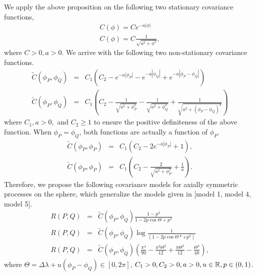\noi We apply the above proposition on the following two stationary covariance functions, 						
			\begin{eqnarray*}
				C(\phi) = Ce^{-a|\phi|} \\
				C(\phi) = C\frac{1}{\sqrt{a^2+\phi^2}},
			\end{eqnarray*}
\noi where $C > 0, a > 0$. We arrive with the following two non-stationary covariance functions.  
			\begin{eqnarray}
				\label{Cm_model1}
				\tilde{C}(\phi_P, \phi_Q) &=& C_1(C_2 - e^{-a|\phi_P|} - e^{-a|\phi_Q|} + e^{-a|\phi_P - \phi_Q|}) \\
				\label{Cm_model2}
				\tilde{C}(\phi_P, \phi_Q) &=& C_1\left(C_2 - \frac{1}{\sqrt{a^2+\phi_P^2}} - \frac{1}{\sqrt{a^2+\phi_Q^2}} + \frac{1}{\sqrt{a^2+(\phi_P-\phi_Q)^2}}\right)
			\end{eqnarray}					      		
where $C_1, a > 0,$ and $C_2 \ge 1$ to ensure the positive definiteness of the above function. When $\phi_P = \phi_Q$, both functions are actually a function of $\phi_P$.		      		
			\begin{eqnarray*}
				\tilde{C}(\phi_P, \phi_P) &=& C_1(C_2 - 2e^{-a|\phi_P|} + 1), \\
				\tilde{C}(\phi_P, \phi_P) &=& C_1\left(C_2 - \frac{2}{\sqrt{a^2+\phi_P^2}} + \frac{1}{a}\right).
			\end{eqnarray*}		
Therefore, we propose the following covariance models for axially symmetric processes on the sphere, which generalize the models given in \cite{Huang2012}[model 1, model 4, model 5].
			\begin{eqnarray}
				R(P,Q) &=& \tilde{C}(\phi_P, \phi_Q) \frac{1-p^2}{1-2p \cos\Theta+p^2} \label{model4} \\
				R(P,Q) &=& \tilde{C}(\phi_P, \phi_Q) \log\frac{1}{(1-2p\cos\Theta* + p^2)} \label{model5} \\
				R(P,Q) &=& \tilde{C}(\phi_P, \phi_Q) \left(\frac{\pi^4}{90}-\frac{\pi^2\Theta^2}{12}+\frac{\pi\Theta^3}{12}-\frac{\Theta^4}{48}\right), \label{model6}
			\end{eqnarray}
where $\Theta=\Delta\lambda+u(\phi_P-\phi_Q) \in [0,2\pi ] $, $C_1 > 0, C_2 > 0, a>0, u\in \mathbb{R}, p\in(0,1)$. \\
					
